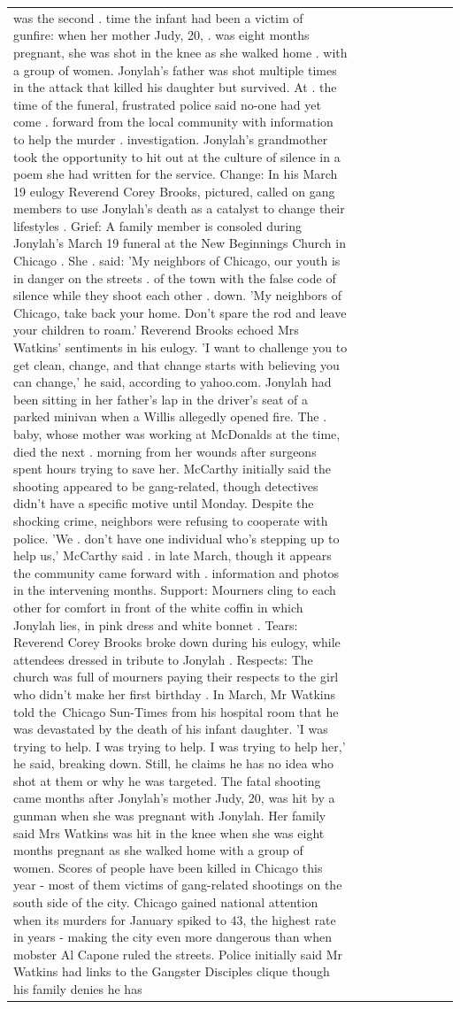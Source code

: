\begin{table}[H]
\begin{tabular}{lllrlllll}
was the second . time the infant had been a victim of gunfire: when her mother Judy, 20, . was eight months pregnant, she was shot in the knee as she walked home . with a group of women. Jonylah's father was shot multiple times in the attack that killed his daughter but survived. At . the time of the funeral, frustrated police said no-one had yet come . forward from the local community with information to help the murder . investigation. Jonylah's grandmother took the opportunity to hit out at the culture of silence in a poem she had written for the service. Change: In his March 19 eulogy Reverend Corey Brooks, pictured, called on gang members to use Jonylah's death as a catalyst to change their lifestyles . Grief: A family member is consoled during Jonylah's March 19 funeral at the New Beginnings Church in Chicago . She . said: 'My neighbors of Chicago, our youth is in danger on the streets . of the town with the false code of silence while they shoot each other . down. 'My neighbors of Chicago, take back your home. Don't spare the rod and leave your children to roam.' Reverend Brooks echoed Mrs Watkins' sentiments in his eulogy. 'I want to challenge you to get clean, change, and that change starts with believing you can change,' he said, according to yahoo.com. Jonylah had been sitting in her father's lap in the driver's seat of a parked minivan when a Willis allegedly opened fire. The . baby, whose mother was working at McDonalds at the time, died the next . morning from her wounds after surgeons spent hours trying to save her. McCarthy initially said the shooting appeared to be gang-related, though detectives didn't have a specific motive until Monday. Despite the shocking crime, neighbors were refusing to cooperate with police. 'We . don't have one individual who's stepping up to help us,' McCarthy said . in late March, though it appears the community came forward with . information and photos in the intervening months. Support: Mourners cling to each other for comfort in front of the white coffin in which Jonylah lies, in pink dress and white bonnet . Tears: Reverend Corey Brooks broke down during his eulogy, while attendees dressed in tribute to Jonylah . Respects: The church was full of mourners paying their respects to the girl who didn't make her first birthday . In March, Mr Watkins told the Chicago Sun-Times from his hospital room that he was devastated by the death of his infant daughter. 'I was trying to help. I was trying to help. I was trying to help her,' he said, breaking down. Still, he claims he has no idea who shot at them or why he was targeted. The fatal shooting came months after Jonylah's mother Judy, 20, was hit by a gunman when she was pregnant with Jonylah. Her family said Mrs Watkins was hit in the knee when she was eight months pregnant as she walked home with a group of women. Scores of people have been killed in Chicago this year - most of them victims of gang-related shootings on the south side of the city. Chicago gained national attention when its murders for January spiked to 43, the highest rate in years - making the city even more dangerous than when mobster Al Capone ruled the streets. Police initially said Mr Watkins had links to the Gangster Disciples clique though his family denies he has 
\end{tabular}
\end{table}
